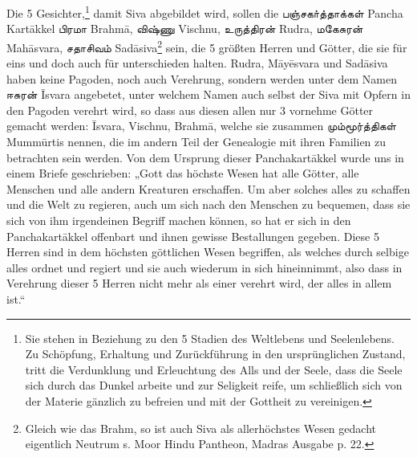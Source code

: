 \documentclass{article}
\newcommand{\TamilText}[1]{\texttamil{#1}}
\newcommand{\tam}[1]{\TamilText{#1}}
\begin{document}
Die 5 Gesichter,\footnote{Sie stehen in Beziehung zu den 5 Stadien des Weltlebens und Seelenlebens. Zu Schöpfung, Erhaltung und Zurückführung in den ursprünglichen Zustand, tritt die Verdunklung und Erleuchtung des Alls und der Seele, dass die Seele sich durch das Dunkel arbeite und zur Seligkeit reife, um schließlich sich von der Materie gänzlich zu befreien und mit der Gottheit zu vereinigen.} damit Siva abgebildet wird, sollen die \tam{பஞ்சகா்த்தாக்கள்} Pancha Kart\={a}kkel \tam{பிரமா} Brahm\={a}, \tam{விஷ்ணு} Vischnu, \tam{உருத்திரன்} Rudra, \tam{மகேசுரன்} Mah\={a}svara, \tam{சதாசிவம்} Sad\={a}siva\footnote{Gleich wie das Brahm, so ist auch Siva als allerhöchstes Wesen gedacht eigentlich Neutrum s. Moor Hindu Pantheon, Madras Ausgabe p. 22.} sein, die 5 größten Herren und Götter, die sie für eins und doch auch für unterschieden halten. Rudra, M\={a}y\={e}svara und Sad\={a}siva haben keine Pagoden, noch auch Verehrung, sondern werden unter dem Namen \tam{ஈசுரன்} \={I}svara angebetet, unter welchem Namen auch selbst der Siva mit Opfern in den Pagoden verehrt wird, so dass aus diesen allen nur 3 vornehme Götter gemacht werden: \={I}svara, Vischnu, Brahm\={a}, welche sie zusammen \tam{மும்மூர்த்திகள்} Mumm\={u}rtis nennen, die im andern Teil der Genealogie mit ihren Familien zu betrachten sein werden. Von dem Ursprung dieser Panchakart\={a}kkel wurde uns in einem Briefe geschrieben: „Gott das höchste Wesen hat alle Götter, alle Menschen und alle andern Kreaturen erschaffen. Um aber solches alles zu schaffen und die Welt zu regieren, auch um sich nach den Menschen zu bequemen, dass sie sich von ihm irgendeinen Begriff machen können, so hat er sich in den Panchakart\={a}kkel offenbart und ihnen gewisse Bestallungen gegeben. Diese 5 Herren sind in dem höchsten göttlichen Wesen begriffen, als welches durch selbige alles ordnet und regiert und sie auch wiederum in sich hineinnimmt, also dass in Verehrung dieser 5 Herren nicht mehr als einer verehrt wird, der alles in allem ist.“
\end{document}
